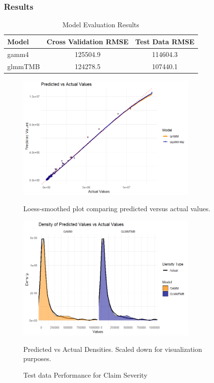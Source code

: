 \documentclass[12pt, twoside,hidelinks]{article}
\theoremstyle{definition}
\numberwithin{equation}{section}
\begin{document}
\subsubsection{Results}

\begin{table}[H]
\centering
\caption{Model Evaluation Results}
\label{table:model_evaluationmort}
\begin{tabular}{lcc}
\hline
\textbf{Model} & \textbf{Cross Validation RMSE} & \textbf{Test Data RMSE} \\
\hline
gamm4 & 125504.9   & 114604.3\\
glmmTMB & 124278.5 & 107440.1 \\
\hline
\end{tabular}
\end{table}

\begin{figure}[H]
\centering

\includegraphics[width=0.8\textwidth]{visuals/InsuranceData/ClaimSeveritypredvact.png}
\caption*{Loess-smoothed plot comparing predicted versus actual values.}
\label{fig:hist_pred_errors}

\includegraphics[width=0.8\textwidth]{visuals/InsuranceData/ClaimSeveritypredvactdens.png}
\caption*{Predicted vs Actual Densities. Scaled down for visualization purposes.}
\label{fig:predicted_vs_actual_densities}

\caption{Test data Performance for Claim Severity}
\label{fig:test_data_performance_4}
\end{figure}
\end{document}
